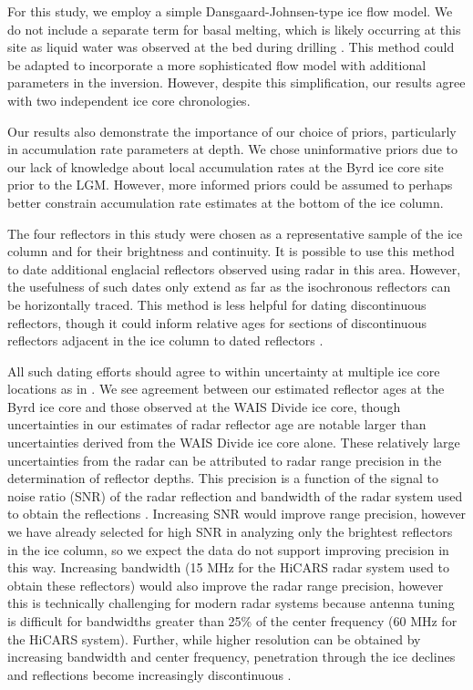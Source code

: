 For this study, we employ a simple Dansgaard-Johnsen-type ice flow model. We do not include a separate term for basal melting, which is likely occurring at this site as liquid water was observed at the bed during drilling \citep{gow1968}. This method could be adapted to incorporate a more sophisticated flow model with additional parameters in the inversion. However, despite this simplification, our results agree with two independent ice core chronologies.

Our results also demonstrate the importance of our choice of priors, particularly in accumulation rate parameters at depth. We chose uninformative priors due to our lack of knowledge about local accumulation rates at the Byrd ice core site prior to the LGM. However, more informed priors could be assumed to perhaps better constrain accumulation rate estimates at the bottom of the ice column. 

The four reflectors in this study were chosen as a representative sample of the ice column and for their brightness and continuity. It is possible to use this method to date additional englacial reflectors observed using radar in this area. However, the usefulness of such dates only extend as far as the isochronous reflectors can be horizontally traced. This method is less helpful for dating discontinuous reflectors, though it could inform relative ages for sections of discontinuous reflectors adjacent in the ice column to dated reflectors \citep{macgregor}.

All such dating efforts should agree to within uncertainty at multiple ice core locations as in \citet{cavitte2016}. We see agreement between our estimated reflector ages at the Byrd ice core and those observed at the WAIS Divide ice core, though uncertainties in our estimates of radar reflector age are notable larger than uncertainties derived from the WAIS Divide ice core alone. These relatively large uncertainties from the radar can be attributed to radar range precision in the determination of reflector depths. This precision is a function of the signal to noise ratio (SNR) of the radar reflection and bandwidth of the radar system used to obtain the reflections \cite{cavitte2016}. Increasing SNR would improve range precision, however we have already selected for high SNR in analyzing only the brightest reflectors in the ice column, so we expect the data do not support improving precision in this way. Increasing bandwidth (15 MHz for the HiCARS radar system used to obtain these reflectors) would also improve the radar range precision, however this is technically challenging for modern radar systems because antenna tuning is difficult for bandwidths greater than 25\% of the center frequency (60 MHz for the HiCARS system). Further, while higher resolution can be obtained by increasing bandwidth and center frequency, penetration through the ice declines and reflections become increasingly discontinuous \citep{cavitte2016}.


